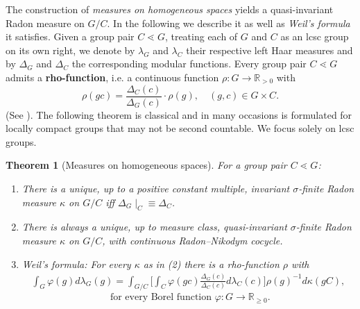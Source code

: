 \documentclass{amsart}
\numberwithin{equation}{subsection}
\newtheorem{thm}{Theorem}[section]
\begin{document}
The construction of {\it measures on homogeneous spaces} yields a quasi-invariant Radon measure on \(G/C\). In the following we describe it as well as \emph{Weil's formula} it satisfies. Given a group pair \(C\lessdot G\), treating each of \(G\) and \(C\) as an lcsc group on its own right, we denote by \(\lambda_{G}\) and \(\lambda_{C}\) their respective left Haar measures and by \(\varDelta_{G}\) and \(\varDelta_{C}\) the corresponding modular functions. Every group pair \(C\lessdot G\) admits a {\bf rho-function}, i.e. a continuous function \(\rho:G\to\mathbb{R}_{>0}\) with
\[\rho\left(gc\right)=\frac{\varDelta_{C}\left(c\right)}{\varDelta_{G}\left(c\right)}\cdot\rho\left(g\right),\quad \left(g,c\right)\in G\times C.\]
(See \cite[Proposition 2.54]{folland1995course}). The following theorem is classical and in many occasions is formulated for locally compact groups that may not be second countable. We focus solely on lcsc groups.

\begin{thm}[Measures on homogeneous spaces]
\label{thm:meashom}
For a group pair \(C\lessdot G\):
\begin{enumerate}
    \item There is a unique, up to a positive constant multiple, invariant \(\sigma\)-finite Radon measure \(\kappa\) on \(G/C\) iff \(\varDelta_{G}\mid_{C}\equiv\varDelta_{C}\).
    \item There is always a unique, up to measure class, quasi-invariant \(\sigma\)-finite Radon measure \(\kappa\) on \(G/C\), with continuous Radon--Nikodym cocycle.
    \item \emph{Weil's formula}: For every \(\kappa\) as in (2) there is a rho-function \(\rho\) with
    \begin{equation}
    \begin{aligned}
    \label{eq:weil1}
    \int_{G}\varphi\left(g\right)d\lambda_{G}\left(g\right)=\int_{G/C}\Big[\int_{C}\varphi\left(gc\right){\textstyle \frac{\varDelta_{G}\left(c\right)}{\varDelta_{C}\left(c\right)}}d\lambda_{C}\left(c\right)\Big]\rho\left(g\right)^{-1}d\kappa\left(gC\right),
    \end{aligned}
    \end{equation}
    \[\text{ for every Borel function } \varphi:G\to\mathbb{R}_{\geq 0}.\]
\end{enumerate}
\end{thm}
\end{document}
